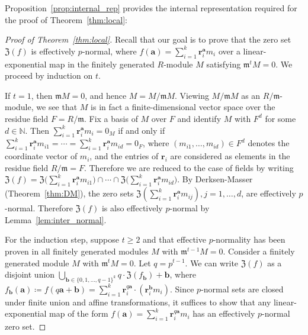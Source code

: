 \documentclass[letterpaper, 11pt, thm-restate]{article}
\numberwithin{equation}{section}
\newcommand{\mZ}{\mathfrak{Z}}
\newcommand{\ba}{\boldsymbol{a}}
\newcommand{\bb}{\boldsymbol{b}}
\newcommand{\br}{\boldsymbol{r}}
\newcommand{\frm}{\mathfrak{m}}
\theoremstyle{definition}
\theoremstyle{definition}
\theoremstyle{definition}
\begin{document}
Proposition~\ref{prop:internal_rep} provides the internal representation required for the proof of Theorem~\ref{thm:local}: 
\begin{proof}[Proof of Theorem~\ref{thm:local}]
    Recall that our goal is to prove that the zero set $\mZ(f)$ is effectively $p$-normal, where $f(\ba) = \sum_{i = 1}^k \br_i^{\ba} m_i$ over a linear-exponential map in the finitely generated $R$-module $M$ satisfying $\frm^t M = 0$.
    We proceed by induction on $t$.
    
    If $t=1$, then $\frm M = 0$, and hence $M=M/\frm M$. 
    Viewing $M/\frm M$ as an $R/\frm$-module, we see that $M$ is in fact a finite-dimensional vector space over the residue field $F=R/\frm$.
    Fix a basis of $M$ over $F$ and identify $M$ with $F^d$ for some $d\in\mathbb N$.
    Then $\sum_{i = 1}^k \br_i^{\ba} m_i = 0_M$ if and only if $\sum_{i = 1}^k \br_i^{\ba} m_{i1} = \cdots = \sum_{i = 1}^k \br_i^{\ba} m_{id} = 0_F$, where $(m_{i1},\ldots,m_{id})\in F^d$ denotes the coordinate vector of $m_i$, and the entries of $\br_i$ are considered as elements in the residue field $R/\frm = F$.
    Therefore we are reduced to the case of fields by writing $\mZ(f) = \mZ\big(\sum_{i = 1}^k \br_i^{\ba} m_{i1}\big) \cap \cdots \cap \mZ\big(\sum_{i = 1}^k \br_i^{\ba} m_{id}\big)$.
    By Derksen-Masser (Theorem~\ref{thm:DM}), the zero sets $\mZ(\sum_{i = 1}^k \br_i^{\ba} m_{ij}), j = 1, \ldots, d$, are effectively $p$-normal.
    Therefore $\mZ(f)$ is also effectively $p$-normal by Lemma~\ref{lem:inter_normal}.

    For the induction step, suppose $t \geq 2$ and that effective $p$-normality has been proven in all finitely generated modules $M$ with $\frm^{t-1}M = 0$.
    Consider a finitely generated module $M$ with $\frm^tM = 0$.
    Let $q = p^{t-1}$.
    We can write $\mZ(f)$ as a disjoint union $\bigcup_{\bb \in \{0, 1, \ldots, q-1\}^k} q \cdot \mZ(f_{\bb}) + \bb$, where $f_{\bb}(\ba) \coloneqq f(q\ba+\bb) = \sum_{i = 1}^k \br_i^{q\ba} \cdot (\br_i^{\bb}m_i)$.
    Since $p$-normal sets are closed under finite union and affine transformations, it suffices to show that any linear-exponential map of the form $f(\ba) = \sum_{i = 1}^k \br_i^{q\ba} m_i$ has an effectively $p$-normal zero set.


\end{proof}
\end{document}
